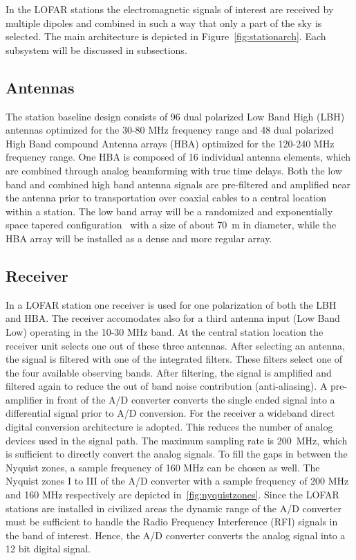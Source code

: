 \documentclass[journal]{IEEEtran}
\begin{document}
In the LOFAR stations the electromagnetic signals of interest are received by multiple dipoles and combined in such a way that only a part of the sky is selected. The main architecture is depicted in Figure~\ref{fig:stationarch}. Each subsystem will be discussed in subsections.


\subsection{Antennas}

The station baseline design consists of 96 dual polarized Low Band High (LBH) antennas optimized for the 30-80 MHz frequency range and 48 dual polarized High Band compound Antenna arrays (HBA) optimized for the 120-240 MHz frequency range. One HBA is composed of 16 individual antenna elements, which are combined through analog beamforming with true time delays. Both the low band and combined high band antenna signals are pre-filtered and amplified near the antenna prior to transportation over coaxial cables to a central location within a station. The low band array will be a randomized and exponentially space tapered configuration~\cite{capp:06} with a size of about 70~m in diameter, while the HBA array will be installed as a dense and more regular array. 

\subsection{Receiver}
In a LOFAR station one receiver is used for one polarization of both the LBH and HBA. The receiver accomodates also for a third antenna input (Low Band Low) operating in the 10-30 MHz band. At the central station location the receiver unit selects one out of these three antennas. After selecting an antenna, the signal is filtered with one of the integrated filters. These filters select one of the four available observing bands. After filtering, the signal is amplified and filtered again to reduce the out of band noise contribution (anti-aliasing). A pre-amplifier in front of the A/D converter converts the single ended signal into a differential signal prior to A/D conversion. For the receiver a wideband direct digital conversion architecture is adopted. This reduces the number of analog devices used in the signal path. The maximum sampling rate is 200~MHz, which is sufficient to directly convert the analog signals. To fill the gaps in between the Nyquist zones, a sample frequency of 160 MHz can be chosen as well. The Nyquist zones I to III of the A/D converter with a sample frequency of 200 MHz and 160 MHz respectively are depicted in~\ref{fig:nyquistzones}. 
Since the LOFAR stations are installed in civilized areas the dynamic range of the A/D converter must be sufficient to handle the Radio Frequency Interference (RFI) signals in the band of interest. Hence, the A/D converter converts the analog signal into a 12 bit digital signal. 
\end{document}
